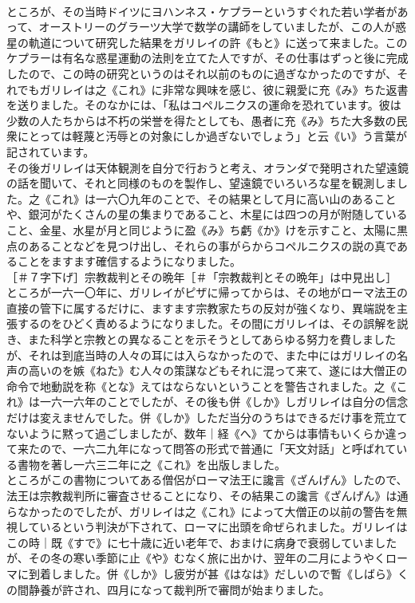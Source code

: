 \documentclass[8pt]{extreport}
\begin{document}
\begin{CJK}{UTF8}{min}
\\	ところが、その当時ドイツにヨハンネス・ケプラーというすぐれた若い学者があって、オーストリーのグラーツ大学で数学の講師をしていましたが、この人が惑星の軌道について研究した結果をガリレイの許《もと》に送って来ました。このケプラーは有名な惑星運動の法則を立てた人ですが、その仕事はずっと後に完成したので、この時の研究というのはそれ以前のものに過ぎなかったのですが、それでもガリレイは之《これ》に非常な興味を感じ、彼に親愛に充《み》ちた返書を送りました。そのなかには、「私はコペルニクスの運命を恐れています。彼は少数の人たちからは不朽の栄誉を得たとしても、愚者に充《み》ちた大多数の民衆にとっては軽蔑と汚辱との対象にしか過ぎないでしょう」と云《い》う言葉が記されています。
\\	その後ガリレイは天体観測を自分で行おうと考え、オランダで発明された望遠鏡の話を聞いて、それと同様のものを製作し、望遠鏡でいろいろな星を観測しました。之《これ》は一六〇九年のことで、その結果として月に高い山のあることや、銀河がたくさんの星の集まりであること、木星には四つの月が附随していること、金星、水星が月と同じように盈《み》ち虧《か》けを示すこと、太陽に黒点のあることなどを見つけ出し、それらの事がらからコペルニクスの説の真であることをますます確信するようになりました。
\\	［＃７字下げ］宗教裁判とその晩年［＃「宗教裁判とその晩年」は中見出し］
\\	ところが一六一〇年に、ガリレイがピザに帰ってからは、その地がローマ法王の直接の管下に属するだけに、ますます宗教家たちの反対が強くなり、異端説を主張するのをひどく責めるようになりました。その間にガリレイは、その誤解を説き、また科学と宗教との異なることを示そうとしてあらゆる努力を費しましたが、それは到底当時の人々の耳には入らなかったので、また中にはガリレイの名声の高いのを嫉《ねた》む人々の策謀などもそれに混って来て、遂には大僧正の命令で地動説を称《とな》えてはならないということを警告されました。之《これ》は一六一六年のことでしたが、その後も併《しか》しガリレイは自分の信念だけは変えませんでした。併《しか》しただ当分のうちはできるだけ事を荒立てないように黙って過ごしましたが、数年｜経《へ》てからは事情もいくらか違って来たので、一六二九年になって問答の形式で普通に「天文対話」と呼ばれている書物を著し一六三二年に之《これ》を出版しました。
\\	ところがこの書物についてある僧侶がローマ法王に讒言《ざんげん》したので、法王は宗教裁判所に審査させることになり、その結果この讒言《ざんげん》は通らなかったのでしたが、ガリレイは之《これ》によって大僧正の以前の警告を無視しているという判決が下されて、ローマに出頭を命ぜられました。ガリレイはこの時｜既《すで》に七十歳に近い老年で、おまけに病身で衰弱していましたが、その冬の寒い季節に止《や》むなく旅に出かけ、翌年の二月にようやくローマに到着しました。併《しか》し疲労が甚《はなは》だしいので暫《しばら》くの間静養が許され、四月になって裁判所で審問が始まりました。

\end{CJK}
\end{document}
